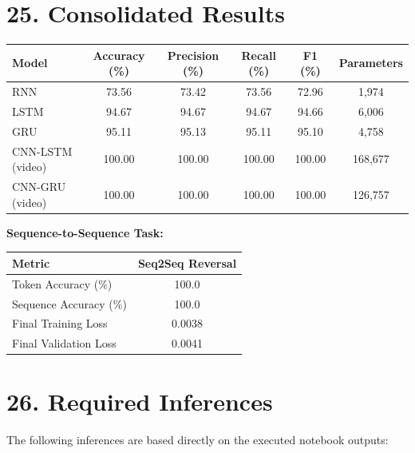 \documentclass[10pt]{article}
\begin{document}
\section*{25. Consolidated Results}

\begin{center}
\begin{tabular}{|l|c|c|c|c|c|}
\hline
\textbf{Model} & \textbf{Accuracy (\%)} & \textbf{Precision (\%)} & \textbf{Recall (\%)} & 
\textbf{F1 (\%)} & \textbf{Parameters}\\
\hline
RNN & 73.56 & 73.42 & 73.56 & 72.96 & 1,974\\
LSTM & 94.67 & 94.67 & 94.67 & 94.66 & 6,006\\
GRU & 95.11 & 95.13 & 95.11 & 95.10 & 4,758\\
CNN-LSTM (video) & 100.00 & 100.00 & 100.00 & 100.00 & 168,677\\
CNN-GRU (video) & 100.00 & 100.00 & 100.00 & 100.00 & 126,757\\
\hline
\end{tabular}
\end{center}

\textbf{Sequence-to-Sequence Task:}

\begin{center}
\begin{tabular}{|l|c|}
\hline
\textbf{Metric} & \textbf{Seq2Seq Reversal}\\
\hline
Token Accuracy (\%) & 100.0\\
Sequence Accuracy (\%) & 100.0\\
Final Training Loss & 0.0038\\
Final Validation Loss & 0.0041\\
\hline
\end{tabular}
\end{center}

\section*{26. Required Inferences}

The following inferences are based directly on the executed notebook outputs:
\end{document}
